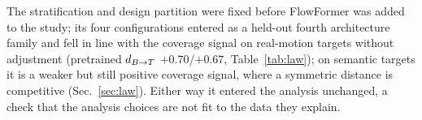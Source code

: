 The stratification and design partition were fixed before FlowFormer was added
to the study; its four configurations entered as a held-out fourth architecture
family and fell in line with the coverage signal on real-motion targets without
adjustment (pretrained $d_{B\to T}$ $+0.70$/$+0.67$, Table~\ref{tab:law}); on semantic
targets it is a weaker but still positive coverage signal, where a symmetric
distance is competitive (Sec.~\ref{sec:law}). Either way it entered the analysis
unchanged, a check that the analysis choices are not fit to the data they explain.
